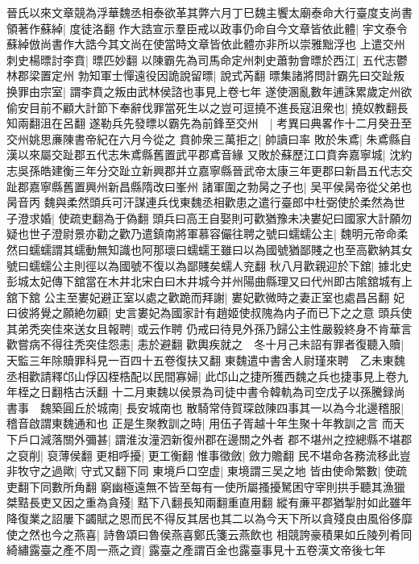 晉氏以來文章競為浮華魏丞相泰欲革其弊六月丁巳魏主饗太廟泰命大行臺度支尚書領著作蘇綽|{
	度徒洛翻}
作大誥宣示羣臣戒以政事仍命自今文章皆依此體|{
	宇文泰令蘇綽倣尚書作大誥今其文尚在使當時文章皆依此體亦非所以崇雅黜浮也}
上遣交州刺史楊㬓討李賁|{
	㬓匹妙翻}
以陳霸先為司馬命定州刺史蕭勃會㬓於西江|{
	五代志鬱林郡梁置定州}
勃知軍士憚遠役因詭說留㬓|{
	說式芮翻}
㬓集諸將問計霸先曰交趾叛换罪由宗室|{
	謂李賁之叛由武林侯諮也事見上卷七年}
遂使溷亂數年逋誅累歲定州欲偷安目前不顧大計節下奉辭伐罪當死生以之豈可逗撓不進長寇沮衆也|{
	撓奴教翻長知兩翻沮在呂翻}
遂勒兵先發㬓以霸先為前鋒至交州　|{
	考異曰典畧作十二月癸丑至交州姚思亷陳書帝紀在六月今從之}
賁帥衆三萬拒之|{
	帥讀曰率}
敗於朱鳶|{
	朱鳶縣自漢以來屬交趾郡五代志朱鳶縣舊置武平郡鳶音緣}
又敗於蘇歷江口賁奔嘉寧城|{
	沈約志吳孫皓建衡三年分交趾立新興郡并立嘉寧縣晉武帝太康三年更郡曰新昌五代志交趾郡嘉寧縣舊置興州新昌縣隋改曰峯州}
諸軍圍之勃昺之子也|{
	吴平侯昺帝從父弟也昺音丙}
魏與柔然頭兵可汗謀連兵伐東魏丞相歡患之遣行臺郎中杜弼使於柔然為世子澄求婚|{
	使疏吏翻為于偽翻}
頭兵曰高王自娶則可歡猶豫未决婁妃曰國家大計願勿疑也世子澄尉景亦勸之歡乃遣鎮南將軍慕容儼往聘之號曰蠕蠕公主|{
	魏明元帝命柔然曰蠕蠕謂其蠕動無知識也阿那瓌曰蠕蠕王雖曰以為國號猶鄙賤之也至高歡納其女號曰蠕蠕公主則徑以為國號不復以為鄙賤矣蠕人兖翻}
秋八月歡親迎於下舘|{
	據北史彭城太妃傳下舘當在木井北宋白曰木井城今并州陽曲縣理又曰代州即古隂舘城有上舘下舘}
公主至婁妃避正室以處之歡跪而拜謝|{
	婁妃歡微時之妻正室也處昌呂翻}
妃曰彼將覺之願絶勿顧|{
	史言婁妃為國家計有趙姬使叔隗為内子而已下之之意}
頭兵使其弟秃突佳來送女且報聘|{
	或云作聘}
仍戒曰待見外孫乃歸公主性嚴毅終身不肯華言歡嘗病不得往秃突佳怨恚|{
	恚於避翻}
歡輿疾就之　冬十月己未詔有罪者復聽入贖|{
	天監三年除贖罪科見一百四十五卷復扶又翻}
東魏遣中書舍人尉瑾來聘　乙未東魏丞相歡請釋邙山俘囚桎梏配以民間寡婦|{
	此邙山之捷所獲西魏之兵也捷事見上卷九年桎之日翻梏古沃翻}
十二月東魏以侯景為司徒中書令韓軌為司空戊子以孫騰録尚書事　魏築圓丘於城南|{
	長安城南也}
散騎常侍賀琛啟陳四事其一以為今北邊稽服|{
	稽音啟謂東魏通和也}
正是生聚教訓之時|{
	用伍子胥越十年生聚十年教訓之言}
而天下戶口減落關外彌甚|{
	謂淮汝潼泗新復州郡在邊關之外者}
郡不堪州之控總縣不堪郡之裒削|{
	裒薄侯翻}
更相呼擾|{
	更工衡翻}
惟事徵斂|{
	斂力贍翻}
民不堪命各務流移此豈非牧守之過歟|{
	守式又翻下同}
東境戶口空虚|{
	東境謂三吴之地}
皆由使命繁數|{
	使疏吏翻下同數所角翻}
窮幽極遠無不皆至每有一使所屬搔擾駑困守宰則拱手聽其漁獵桀黠長吏又因之重為貪殘|{
	黠下八翻長知兩翻重直用翻}
縱有亷平郡猶掣肘如此雖年降復業之詔屢下蠲賦之恩而民不得反其居也其二以為今天下所以貪殘良由風俗侈靡使之然也今之燕喜|{
	詩魯頌曰魯侯燕喜鄭氏箋云燕飲也}
相競誇豪積果如丘陵列肴同綺繡露臺之產不周一燕之資|{
	露臺之產謂百金也露臺事見十五卷漢文帝後七年}
